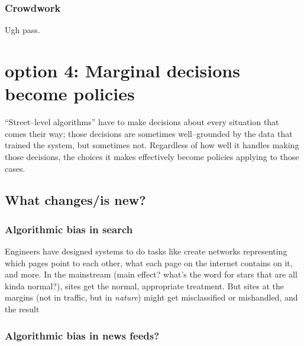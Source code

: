 \documentclass[main]{subfiles}
\begin{document}


\subsubsection{Crowdwork}
Ugh pass.





\section{option 4: Marginal decisions become policies}

``Street--level algorithms'' have to make decisions about every situation that comes their way;
those decisions are sometimes well--grounded by the data that trained the system, but sometimes not.
Regardless of how well it handles making those decisions, the choices it makes
effectively become policies applying to those cases.

\subsection{What changes/is new?}

\subsubsection{Algorithmic bias in search}
Engineers have designed systems to do tasks like create networks representing which pages point to each other,
what each page on the internet contains on it, and more.
In the mainstream (main effect? what's the word for stars that are all kinda normal?),
sites get the normal, appropriate treatment.
But sites at the margins (not in traffic, but in \textit{nature})
might get misclassified or mishandled, and the result 


\subsubsection{Algorithmic bias in news feeds?}



\onlyinsubfile{
  
  
}
\end{document}
